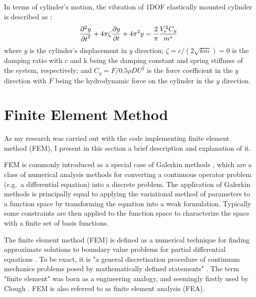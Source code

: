 In terms of cylinder's motion, the vibration of 1DOF elastically mounted cylinder is described as : 
\begin{equation} \label{eqn2}
	\frac{\partial^2 y}{{\partial t}^2}+4 \pi \zeta \frac{\partial y}{{\partial t}}+4\pi^2y=\frac{2}{\pi}\frac{V_r^2 C_y}{m^*}
\end{equation}
where $ y $ is the cylinder's displacement in $ y $ direction; $ \zeta=c/(2\sqrt{km})=0 $ is the damping ratio with c and k being the damping constant and spring stiffness of the system, respectively; and $ C_y=F/0.5 \rho D U^2 $ is the force coefficient in the $ y $ direction with $ F $ being the hydrodynamic force on the cylinder in the $ y $ direction.



\section{Finite Element Method} \label{sec fem}

As my research was carried out with the code implementing finite element method (FEM), I present in this section a brief description and explanation of it.

FEM is commonly introduced as a special case of Galerkin methods \cite{aboutfem2016}, which are a class of numerical analysis methods for converting a continuous operator problem (e.g.\ a differential equation) into a discrete problem. The application of Galerkin methods is principally equal to applying the variational method of parameters to a function space by transforming the equation into a weak formulation. Typically some constraints are then applied to the function space to characterize the space with a finite set of basis functions. \cite{galerkinmethod2016}


The finite element method (FEM) is defined as a numerical technique for finding approximate solutions to boundary value problems for partial differential equations \cite{finiteelementmethod2016}. To be exact, it is "a general discretisation procedure of continuum mechanics problems posed by mathematically defined statements" \cite{Zienkiewicz2013}. The term "finite element" was born as a engineering analogy, and seemingly firstly used by Clough \cite{Clough1960}. FEM is also referred to as finite element analysis (FEA). 

